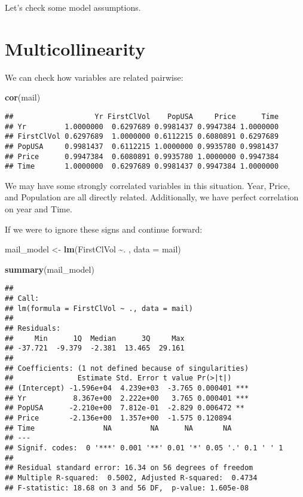 \documentclass[
]{article}
\newenvironment{Shaded}{\begin{snugshade}}{\end{snugshade}}
\newcommand{\AttributeTok}[1]{\textcolor[rgb]{0.13,0.29,0.53}{#1}}
\newcommand{\FunctionTok}[1]{\textcolor[rgb]{0.13,0.29,0.53}{\textbf{#1}}}
\newcommand{\NormalTok}[1]{#1}
\newcommand{\OtherTok}[1]{\textcolor[rgb]{0.56,0.35,0.01}{#1}}
\newcommand{\SpecialCharTok}[1]{\textcolor[rgb]{0.81,0.36,0.00}{\textbf{#1}}}
\begin{document}
Let's check some model assumptions.

\section{Multicollinearity}\label{multicollinearity}

We can check how variables are related pairwise:

\begin{Shaded}
\begin{Highlighting}[]
\FunctionTok{cor}\NormalTok{(mail)}
\end{Highlighting}
\end{Shaded}

\begin{verbatim}
##                   Yr FirstClVol    PopUSA     Price      Time
## Yr         1.0000000  0.6297689 0.9981437 0.9947384 1.0000000
## FirstClVol 0.6297689  1.0000000 0.6112215 0.6080891 0.6297689
## PopUSA     0.9981437  0.6112215 1.0000000 0.9935780 0.9981437
## Price      0.9947384  0.6080891 0.9935780 1.0000000 0.9947384
## Time       1.0000000  0.6297689 0.9981437 0.9947384 1.0000000
\end{verbatim}

We may have some strongly correlated variables in this situation. Year,
Price, and Population are all directly related. Additionally, we have
perfect correlation on year and Time.

If we were to ignore these signs and continue forward:

\begin{Shaded}
\begin{Highlighting}[]
\NormalTok{mail\_model }\OtherTok{\textless{}{-}} \FunctionTok{lm}\NormalTok{(FirstClVol }\SpecialCharTok{\textasciitilde{}}\NormalTok{. , }\AttributeTok{data =}\NormalTok{ mail)}

\FunctionTok{summary}\NormalTok{(mail\_model)}
\end{Highlighting}
\end{Shaded}

\begin{verbatim}
## 
## Call:
## lm(formula = FirstClVol ~ ., data = mail)
## 
## Residuals:
##     Min      1Q  Median      3Q     Max 
## -37.721  -9.379  -2.381  13.465  29.161 
## 
## Coefficients: (1 not defined because of singularities)
##               Estimate Std. Error t value Pr(>|t|)    
## (Intercept) -1.596e+04  4.239e+03  -3.765 0.000401 ***
## Yr           8.367e+00  2.222e+00   3.765 0.000401 ***
## PopUSA      -2.210e+00  7.812e-01  -2.829 0.006472 ** 
## Price       -2.136e+00  1.357e+00  -1.575 0.120894    
## Time                NA         NA      NA       NA    
## ---
## Signif. codes:  0 '***' 0.001 '**' 0.01 '*' 0.05 '.' 0.1 ' ' 1
## 
## Residual standard error: 16.34 on 56 degrees of freedom
## Multiple R-squared:  0.5002, Adjusted R-squared:  0.4734 
## F-statistic: 18.68 on 3 and 56 DF,  p-value: 1.605e-08
\end{verbatim}
\end{document}
